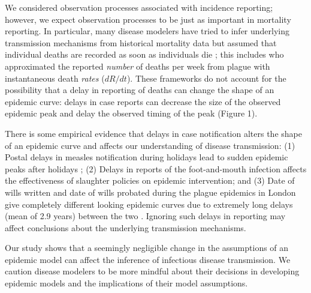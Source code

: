 \documentclass[12pt]{article}\usepackage[]{graphicx}\usepackage[]{color}
\begin{document}
We considered observation processes associated with incidence 
reporting; however, we expect observation processes to be just as important
in mortality reporting. In particular, many disease modelers have
tried to infer underlying transmission mechanisms from historical mortality 
data but assumed that individual deaths are recorded as soon as individuals die 
\citep{he2013inferring, didelot2017model, dean2018human}; this includes
\cite{kermack1927contribution} who approximated the reported \emph{number} of
deaths per week from plague with instantaneous death \emph{rates} ($dR/dt$).
These frameworks do not account for the possibility 
that a delay in reporting of deaths can
change the shape of an epidemic curve: delays in case reports can decrease
the size of the observed epidemic peak and delay the observed timing of the peak (Figure 1). 

There is some empirical evidence that delays in case notification alters the
shape of an epidemic curve and affects our understanding of disease transmission:
(1) Postal delays in measles notification during holidays lead to sudden
epidemic peaks after holidays \citep{fine1982measles}; 
(2) Delays in reports of the foot-and-mouth infection affects the effectiveness
of slaughter policies on epidemic intervention;
and (3) Date of wills written and date of wills probated during
the plague epidemics in London give completely different looking epidemic curves
due to extremely long delays (mean of 2.9 years) between the two \citep{bushby2019wills}.
Ignoring such delays in reporting may affect conclusions about the underlying 
transmission mechanisms.

Our study shows that a seemingly negligible change in the assumptions of an epidemic
model can affect the inference of infectious disease transmission.
We caution disease modelers to be more mindful about their decisions in developing
epidemic models and the implications of their model assumptions.


\end{document}
